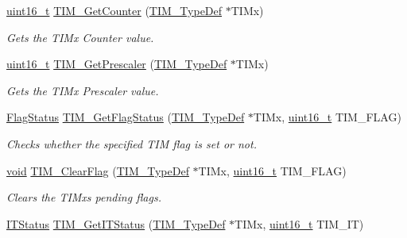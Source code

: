 \begin{DoxyCompactItemize}
\hyperlink{_p_e___types_8h_a1f1825b69244eb3ad2c7165ddc99c956}{uint16\+\_\+t} \hyperlink{group___t_i_m___exported___functions_gab6826b144ae70e206f51ae8af5318a93}{T\+I\+M\+\_\+\+Get\+Counter} (\hyperlink{struct_t_i_m___type_def}{T\+I\+M\+\_\+\+Type\+Def} $\ast$T\+I\+Mx)
\begin{DoxyCompactList}\small\item\em Gets the T\+I\+Mx Counter value. \end{DoxyCompactList}\item 
\hyperlink{_p_e___types_8h_a1f1825b69244eb3ad2c7165ddc99c956}{uint16\+\_\+t} \hyperlink{group___t_i_m___exported___functions_ga427eb6e533480e02a27cd0ca876183d6}{T\+I\+M\+\_\+\+Get\+Prescaler} (\hyperlink{struct_t_i_m___type_def}{T\+I\+M\+\_\+\+Type\+Def} $\ast$T\+I\+Mx)
\begin{DoxyCompactList}\small\item\em Gets the T\+I\+Mx Prescaler value. \end{DoxyCompactList}\item 
\hyperlink{agilefox_2library_2inc_2stm32f10x__type_8h_a89136caac2e14c55151f527ac02daaff}{Flag\+Status} \hyperlink{group___t_i_m___exported___functions_ga0adcbbd5e838ec8642e7a9b80075f41f}{T\+I\+M\+\_\+\+Get\+Flag\+Status} (\hyperlink{struct_t_i_m___type_def}{T\+I\+M\+\_\+\+Type\+Def} $\ast$T\+I\+Mx, \hyperlink{_p_e___types_8h_a1f1825b69244eb3ad2c7165ddc99c956}{uint16\+\_\+t} T\+I\+M\+\_\+\+F\+L\+AG)
\begin{DoxyCompactList}\small\item\em Checks whether the specified T\+IM flag is set or not. \end{DoxyCompactList}\item 
\hyperlink{usb__devapi_8h_afabf60e7f57651d6d595a02c75f07cd0}{void} \hyperlink{group___t_i_m___exported___functions_ga46568c7b254941dc53e785342d60baf3}{T\+I\+M\+\_\+\+Clear\+Flag} (\hyperlink{struct_t_i_m___type_def}{T\+I\+M\+\_\+\+Type\+Def} $\ast$T\+I\+Mx, \hyperlink{_p_e___types_8h_a1f1825b69244eb3ad2c7165ddc99c956}{uint16\+\_\+t} T\+I\+M\+\_\+\+F\+L\+AG)
\begin{DoxyCompactList}\small\item\em Clears the T\+I\+Mx\textquotesingle{}s pending flags. \end{DoxyCompactList}\item 
\hyperlink{agilefox_2library_2inc_2stm32f10x__type_8h_aacbd7ed539db0aacd973a0f6eca34074}{I\+T\+Status} \hyperlink{group___t_i_m___exported___functions_ga0827a0b411707304f76d33050727c24d}{T\+I\+M\+\_\+\+Get\+I\+T\+Status} (\hyperlink{struct_t_i_m___type_def}{T\+I\+M\+\_\+\+Type\+Def} $\ast$T\+I\+Mx, \hyperlink{_p_e___types_8h_a1f1825b69244eb3ad2c7165ddc99c956}{uint16\+\_\+t} T\+I\+M\+\_\+\+IT)

\end{DoxyCompactItemize}
